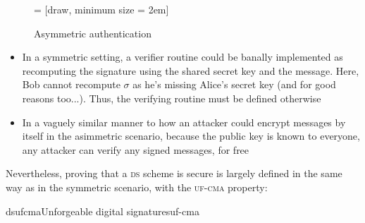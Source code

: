 \begin{figure}
    \centering

     = [draw, minimum size = 2em]

    \caption{Asymmetric authentication}
    \label{fig:digisign}
\end{figure}

\begin{itemize}
    \item In a symmetric setting, a verifier routine could be banally implemented as recomputing the signature using the shared secret key and the message. Here, Bob cannot recompute $\sigma$ as he's missing Alice's secret key (and for good reasons too...). Thus, the verifying routine must be defined otherwise
    \item In a vaguely similar manner to how an attacker could encrypt messages by itself in the asimmetric scenario, because the public key is known to everyone, any attacker can verify any signed messages, for free
\end{itemize}

Nevertheless, proving that a \textsc{ds} scheme is secure is largely defined in the same way as in the symmetric scenario, with the \textsc{uf-cma} property:

\begin{cryptogame}{dsufcma}{Unforgeable digital signatures}{uf-cma}
    

    \postlevel


    \postlevel


\end{cryptogame}

